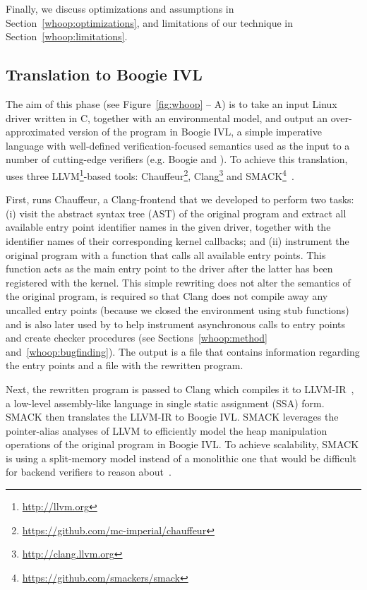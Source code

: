 {Finally, we discuss optimizations and assumptions in Section~\ref{whoop:optimizations}, and limitations of our technique in Section~\ref{whoop:limitations}.

\subsection{Translation to Boogie IVL}
\label{whoop:translation}

The aim of this phase (see Figure~\ref{fig:whoop} -- A) is to take an input Linux driver written in C, together with an environmental model, and output an over-approximated version of the program in Boogie IVL, a simple imperative language with well-defined verification-focused semantics used as the input to a number of cutting-edge verifiers (e.g. Boogie and \corral). To achieve this translation, \whoop uses three LLVM\footnote{\url{http://llvm.org}}-based tools: Chauffeur\footnote{\url{https://github.com/mc-imperial/chauffeur}}, Clang\footnote{\url{http://clang.llvm.org}} and SMACK\footnote{\url{https://github.com/smackers/smack}}~\cite{rakamaric2014smack}.

First, \whoop runs Chauffeur, a Clang-frontend that we developed to perform two tasks: (i) visit the abstract syntax tree (AST) of the original program and extract all available entry point identifier names in the given driver, together with the identifier names of their corresponding kernel callbacks; and (ii) instrument the original program with a function that calls all available entry points. This function acts as the main entry point to the driver after the latter has been registered with the kernel. This simple rewriting does not alter the semantics of the original program, is required so that Clang does not compile away any uncalled entry points (because we closed the environment using stub functions) and is also later used by \whoop to help instrument asynchronous calls to entry points and create checker procedures (see Sections~\ref{whoop:method} and~\ref{whoop:bugfinding}). The output is a file that contains information regarding the entry points and a file with the rewritten program.

Next, the rewritten program is passed to Clang which compiles it to LLVM-IR~\cite{lattner2004llvm}, a low-level assembly-like language in single static assignment (SSA) form. SMACK then translates the LLVM-IR to Boogie IVL. SMACK leverages the pointer-alias analyses of LLVM to efficiently model the heap manipulation operations of the original program in Boogie IVL. To achieve scalability, SMACK is using a split-memory model instead of a monolithic one that would be difficult for backend verifiers to reason about~\cite{rakamaric2009scalable}.

}
